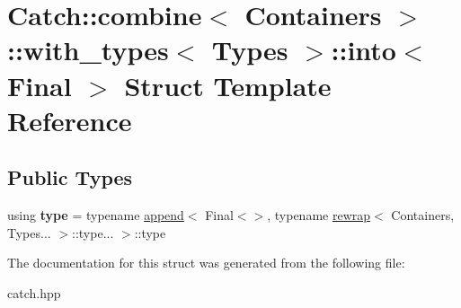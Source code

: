 \hypertarget{structCatch_1_1combine_1_1with__types_1_1into}{}\section{Catch\+::combine$<$ Containers $>$\+::with\+\_\+types$<$ Types $>$\+::into$<$ Final $>$ Struct Template Reference}
\label{structCatch_1_1combine_1_1with__types_1_1into}
\subsection*{Public Types}
\begin{DoxyCompactItemize}
\item 
\mbox{\label{structCatch_1_1combine_1_1with__types_1_1into_a62e7f47f468f2aedf969fb201b68bb81}} 
using {\bfseries type} = typename \mbox{\hyperlink{structCatch_1_1append}{append}}$<$ Final$<$$>$, typename \mbox{\hyperlink{structCatch_1_1rewrap}{rewrap}}$<$ Containers, Types... $>$\+::type... $>$\+::type
\end{DoxyCompactItemize}


The documentation for this struct was generated from the following file\+:\begin{DoxyCompactItemize}
\item 
catch.\+hpp\end{DoxyCompactItemize}
